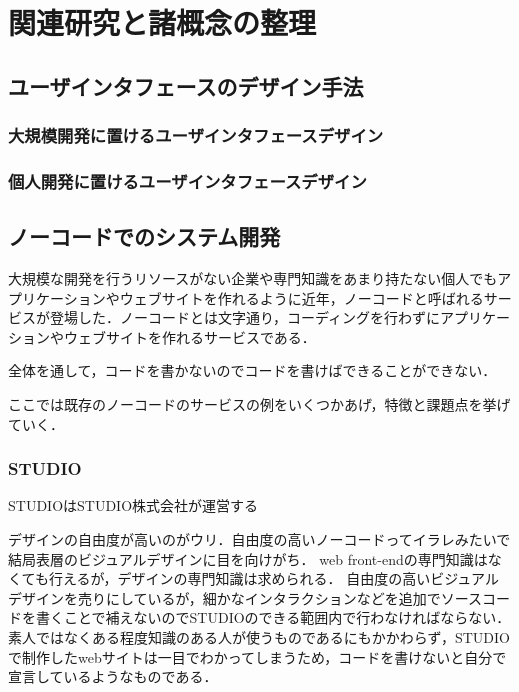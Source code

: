 \chapter{関連研究と諸概念の整理}
\label{chap:prevresearch}

\section{ユーザインタフェースのデザイン手法}


\subsection{大規模開発に置けるユーザインタフェースデザイン}
\subsection{個人開発に置けるユーザインタフェースデザイン}

\section{ノーコードでのシステム開発}
大規模な開発を行うリソースがない企業や専門知識をあまり持たない個人でもアプリケーションやウェブサイトを作れるように近年，ノーコードと呼ばれるサービスが登場した．ノーコードとは文字通り，コーディングを行わずにアプリケーションやウェブサイトを作れるサービスである．

全体を通して，コードを書かないのでコードを書けばできることができない．


ここでは既存のノーコードのサービスの例をいくつかあげ，特徴と課題点を挙げていく．
\subsection{STUDIO}
STUDIOはSTUDIO株式会社が運営する

デザインの自由度が高いのがウリ．自由度の高いノーコードってイラレみたいで結局表層のビジュアルデザインに目を向けがち．
web front-endの専門知識はなくても行えるが，デザインの専門知識は求められる．
自由度の高いビジュアルデザインを売りにしているが，細かなインタラクションなどを追加でソースコードを書くことで補えないのでSTUDIOのできる範囲内で行わなければならない．
素人ではなくある程度知識のある人が使うものであるにもかかわらず，STUDIOで制作したwebサイトは一目でわかってしまうため，コードを書けないと自分で宣言しているようなものである．

